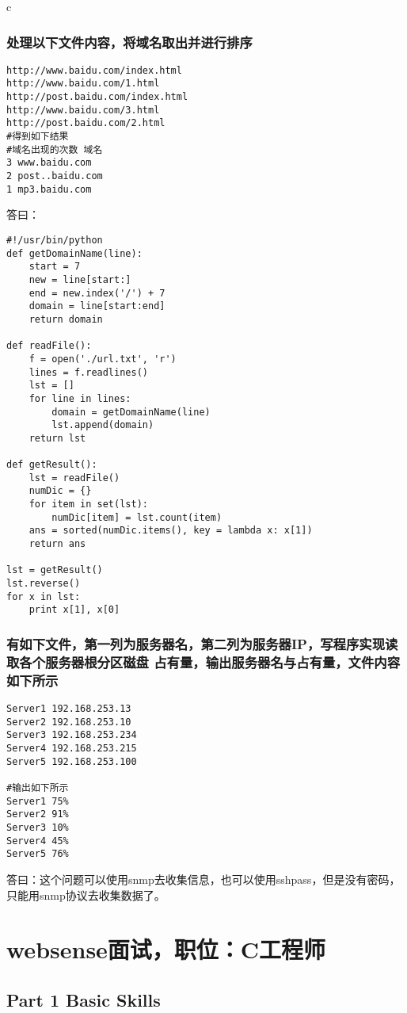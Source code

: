 \documentclass{article}
\begin{document}
\begin{mitned}{c}
\subsubsection{处理以下文件内容，将域名取出并进行排序}
\begin{verbatim}
http://www.baidu.com/index.html
http://www.baidu.com/1.html
http://post.baidu.com/index.html
http://www.baidu.com/3.html
http://post.baidu.com/2.html
#得到如下结果
#域名出现的次数 域名
3 www.baidu.com
2 post..baidu.com
1 mp3.baidu.com

\end{verbatim}

答曰：

\begin{verbatim}
#!/usr/bin/python
def getDomainName(line):
	start = 7
	new = line[start:]
	end = new.index('/') + 7
	domain = line[start:end]
	return domain

def readFile():
	f = open('./url.txt', 'r')
	lines = f.readlines()
	lst = []
	for line in lines:
		domain = getDomainName(line)
		lst.append(domain)
	return lst	

def getResult():
	lst = readFile()
	numDic = {}
	for item in set(lst):
		numDic[item] = lst.count(item)
	ans = sorted(numDic.items(), key = lambda x: x[1])
	return ans

lst = getResult()
lst.reverse()
for x in lst:
	print x[1], x[0]
\end{verbatim}


\subsubsection{有如下文件，第一列为服务器名，第二列为服务器IP，写程序实现读取各个服务器根分区磁盘
占有量，输出服务器名与占有量，文件内容如下所示}
\begin{verbatim}
Server1 192.168.253.13
Server2 192.168.253.10
Server3 192.168.253.234
Server4 192.168.253.215
Server5 192.168.253.100

#输出如下所示
Server1 75%
Server2 91%
Server3 10%
Server4 45%
Server5 76%
\end{verbatim}
答曰：这个问题可以使用snmp去收集信息，也可以使用sshpass，但是没有密码，只能用snmp协议去收集数据了。


\section{websense面试，职位：C工程师}
\subsection{Part 1 Basic Skills}

\end{mitned}
\end{document}

